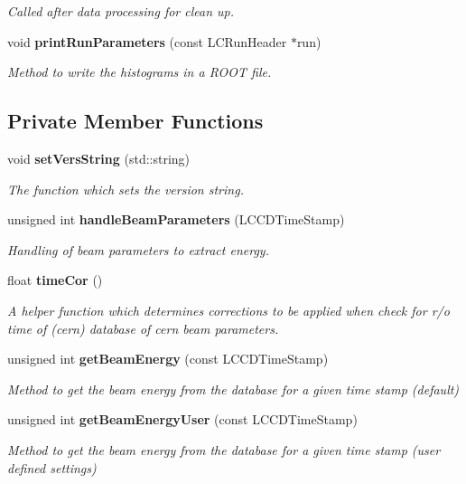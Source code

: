 \begin{DoxyCompactItemize}
\begin{DoxyCompactList}\small\item\em Called after data processing for clean up. \end{DoxyCompactList}\item 
void {\bf print\-Run\-Parameters} (const L\-C\-Run\-Header $\ast$run)\label{classmarlin_1_1RunInfoProcessor_ae0df13a558cff819a125d7da430d3ca8}

\begin{DoxyCompactList}\small\item\em Method to write the histograms in a R\-O\-O\-T file. \end{DoxyCompactList}\end{DoxyCompactItemize}
\subsection*{Private Member Functions}
\begin{DoxyCompactItemize}
\item 
void {\bf set\-Vers\-String} (std\-::string)\label{classmarlin_1_1RunInfoProcessor_ac7333b2dd94c0dfaf019efda7d51783c}

\begin{DoxyCompactList}\small\item\em The function which sets the version string. \end{DoxyCompactList}\item 
unsigned int {\bf handle\-Beam\-Parameters} (L\-C\-C\-D\-Time\-Stamp)
\begin{DoxyCompactList}\small\item\em Handling of beam parameters to extract energy. \end{DoxyCompactList}\item 
float {\bf time\-Cor} ()
\begin{DoxyCompactList}\small\item\em A helper function which determines corrections to be applied when check for r/o time of (cern) database of cern beam parameters. \end{DoxyCompactList}\item 
unsigned int {\bf get\-Beam\-Energy} (const L\-C\-C\-D\-Time\-Stamp)\label{classmarlin_1_1RunInfoProcessor_af25973c2f75e0cc7d1a2e963ae6f1ae0}

\begin{DoxyCompactList}\small\item\em Method to get the beam energy from the database for a given time stamp (default) \end{DoxyCompactList}\item 
unsigned int {\bf get\-Beam\-Energy\-User} (const L\-C\-C\-D\-Time\-Stamp)\label{classmarlin_1_1RunInfoProcessor_a2a9f3d4420e6d5413b52aa4a9f909ab2}

\begin{DoxyCompactList}\small\item\em Method to get the beam energy from the database for a given time stamp (user defined settings) \end{DoxyCompactList}\end{DoxyCompactItemize}
